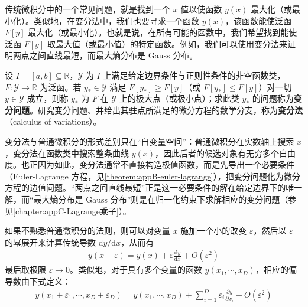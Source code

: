 \documentclass[../main.tex]{subfiles}
\begin{document}
传统微积分中的一个常见问题，就是找到一个 $x$ 值以使函数 $y(x)$ 最大化（或最小化）。类似地，在变分法中，我们也要寻求一个函数 $y(x)$，该函数能使泛函 $F[y]$ 最大化（或最小化）。也就是说，在所有可能的函数中，我们希望找到能使泛函 $F[y]$ 取最大值（或最小值）的特定函数。例如，我们可以使用变分法来证明两点之间直线最短，而最大熵分布是 Gauss 分布。

\begin{definition}[变分法]\label{definition:appB-变分法}
设 $I=[a,b]\subseteq\mathbb{R}$，$\mathcal{Y}$ 为 $I$ 上满足给定边界条件与正则性条件的非空函数类，$F:\mathcal{Y}\to\mathbb{R}$ 为泛函。若 $y_{*}\in\mathcal{Y}$ 满足 $F[y_{*}]\geqslant F[y]$（或 $F[y_{*}]\leqslant F[y]$）对一切 $y\in\mathcal{Y}$ 成立，则称 $y_{*}$ 为 $F$ 在 $\mathcal{Y}$ 上的极大点（或极小点）；求此类 $y_{*}$ 的问题称为\textbf{变分问题}。研究变分问题、并给出其驻点所满足的微分方程的数学分支，称为\textbf{变分法}（calculus of variations）。
\end{definition}

\begin{remark}
变分法与普通微积分的形式差别只在“自变量空间”：普通微积分在实数轴上搜索 $x$，变分法在函数类中搜索整条曲线 $y(x)$，因此后者的候选对象有无穷多个自由度。也正因为如此，变分法通常不直接构造极值函数，而是先导出一个必要条件（Euler-Lagrange 方程，见\cref{theorem:appB-euler-lagrange}），把变分问题化为微分方程的边值问题。“两点之间直线最短”正是这一必要条件的解在给定边界下的唯一解，而“最大熵分布是 Gauss 分布”则是在归一化约束下求解相应的变分问题（参见\cref{chapter:appC-Lagrange乘子}）。
\end{remark}

如果不熟悉普通微积分的法则，则可以对变量 $x$ 施加一个小的改变 $\varepsilon$，然后以 $\varepsilon$ 的幂展开来计算传统导数 $\mathrm{d}y/\mathrm{d}x$，从而有
\begin{align}
  y(x+\varepsilon)=y(x)+\varepsilon\frac{\mathrm{d}y}{\mathrm{d}x}+O(\varepsilon^{2})
  \label{align:appB-导数展开}
\end{align}
最后取极限 $\varepsilon\to0$。类似地，对于具有多个变量的函数 $y(x_1,\cdots,x_D)$，相应的偏导数由下式定义：
\begin{align}
  y(x_1+\varepsilon_1,\cdots,x_D+\varepsilon_D)=y(x_1,\cdots,x_D)+\sum_{i=1}^{D}\varepsilon_i\frac{\partial y}{\partial x_i}+O(\varepsilon^{2})
  \label{align:appB-偏导展开}
\end{align}
\end{document}
